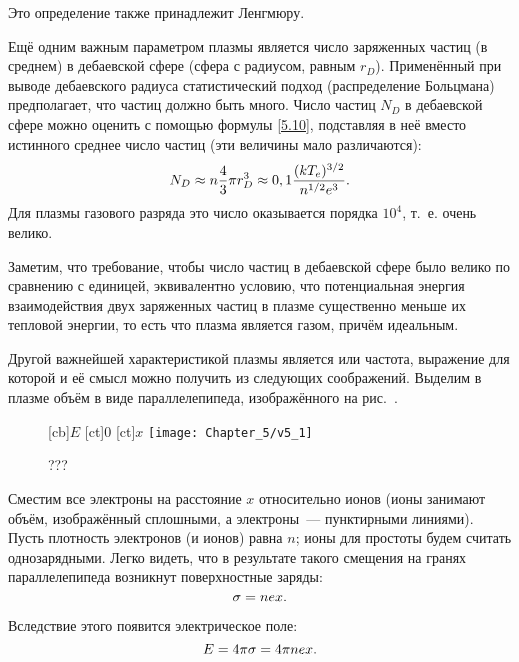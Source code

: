 Это определение также принадлежит Ленгмюру.

Ещё одним важным параметром плазмы является число заряженных частиц (в среднем)
в дебаевской сфере (сфера с радиусом,
равным $r_D$). Применённый при выводе дебаевского радиуса статистический подход
(распределение Больцмана) предполагает,
что частиц должно быть много. Число частиц $N_D$ в дебаевской сфере можно
оценить с помощью формулы \eqref{5.10},
подставляя в неё вместо истинного среднее число частиц (эти величины мало
различаются):
\begin{equation}
	\eqmark{5.12}
	N_D\approx n\frac43\pi r_D^3\approx0,1\frac{(kT_e)^{3/2}}{n^{1/2}e^3}.
\end{equation}
Для плазмы газового разряда это число оказывается порядка $10^4$, т.~е. очень
велико.

Заметим, что требование, чтобы число частиц в дебаевской сфере было велико по
сравнению с единицей, эквивалентно
условию, что потенциальная энергия взаимодействия двух заряженных частиц в
плазме существенно меньше их тепловой
энергии, то есть что плазма является газом, причём идеальным.

Другой важнейшей характеристикой плазмы является  или
 частота, выражение для
которой и её смысл можно получить из следующих соображений. Выделим в плазме
объём в виде параллелепипеда, изображённого на рис.~.

\begin{figure}[h!]
	[cb]{$E$}
	[ct]{0}
	[ct]{$x$}
	\centering
	\texttt{[image: Chapter\_5/v5\_1]}
	\caption{???}
\end{figure}

Сместим все электроны на расстояние $x$ относительно ионов (ионы занимают объём,
изображённый сплошными, а
электроны~--- пунктирными линиями).
Пусть плотность электронов (и ионов) равна $n$; ионы для простоты будем считать
однозарядными. Легко видеть, что в результате такого смещения на гранях
параллелепипеда возникнут поверхностные заряды:
\begin{equation}
	\eqmark{5.13}
	\sigma=nex.
\end{equation}

Вследствие этого появится электрическое поле:
\begin{equation}
	\eqmark{5.14}
	E=4\pi\sigma=4\pi nex.
\end{equation}

